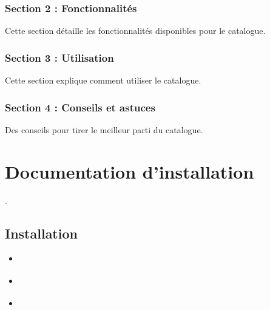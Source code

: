 \documentclass[letterpaper,10pt,french]{sphinxmanual}
\begin{document}
\subsection{Section 2 : Fonctionnalités}
\label{\detokenize{doc_admin/analytics:section-2-fonctionnalites}}
\sphinxAtStartPar
Cette section détaille les fonctionnalités disponibles pour le catalogue.


\subsection{Section 3 : Utilisation}
\label{\detokenize{doc_admin/analytics:section-3-utilisation}}
\sphinxAtStartPar
Cette section explique comment utiliser le catalogue.


\subsection{Section 4 : Conseils et astuces}
\label{\detokenize{doc_admin/analytics:section-4-conseils-et-astuces}}
\sphinxAtStartPar
Des conseils pour tirer le meilleur parti du catalogue.

\sphinxstepscope


\chapter{Documentation d’installation}
\label{\detokenize{doc_instal:documentation-d-installation}}\label{\detokenize{doc_instal::doc}}
\sphinxAtStartPar
{}.

\sphinxstepscope


\section{Installation}
\label{\detokenize{doc_instal/installation:installation}}\label{\detokenize{doc_instal/installation::doc}}
\begin{sphinxShadowBox}
\begin{itemize}
\item {} 
\sphinxAtStartPar
{}\label{\detokenize{doc_instal/installation:id1}}{\hyperref[\detokenize{doc_instal/installation:introduction}]{}}

\item {} 
\sphinxAtStartPar
{}\label{\detokenize{doc_instal/installation:id2}}{\hyperref[\detokenize{doc_instal/installation:ansible}]{}}

\item {} 
\sphinxAtStartPar
{}\label{\detokenize{doc_instal/installation:id3}}{\hyperref[\detokenize{doc_instal/installation:script-de-personnalisation}]{}}

\end{itemize}
\end{sphinxShadowBox}
\end{document}
